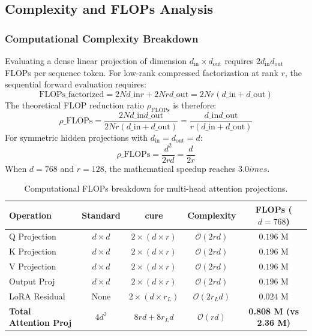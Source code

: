 \subsection{Complexity and FLOPs Analysis}
\subsubsection{Computational Complexity Breakdown}
Evaluating a dense linear projection of dimension $d_{\text{in}} \times d_{\text{out}}$ requires $2 d_{\text{in}} d_{\text{out}}$ FLOPs per sequence token. For low-rank compressed factorization at rank $r$, the sequential forward evaluation requires:
\[
\text{FLOPs}\_{\text{factorized}} = 2 N d\_{\text{in}} r + 2 N r d\_{\text{out}} = 2 N r (d\_{\text{in}} + d\_{\text{out}})
\]
The theoretical FLOP reduction ratio $\rho_{\text{FLOPs}}$ is therefore:
\[
\rho\_{\text{FLOPs}} = \frac{2 N d\_{\text{in}} d\_{\text{out}}}{2 N r (d\_{\text{in}} + d\_{\text{out}})} = \frac{d\_{\text{in}} d\_{\text{out}}}{r (d\_{\text{in}} + d\_{\text{out}})}
\]
For symmetric hidden projections with $d_{\text{in}} = d_{\text{out}} = d$:
\[
\rho\_{\text{FLOPs}} = \frac{d^2}{2 r d} = \frac{d}{2 r}
\]
When $d = 768$ and $r = 128$, the mathematical speedup reaches $3.0	imes$.

\begin{table}[H]
\centering
\small
\begin{tabular}{lcccc}
\toprule
\textbf{Operation} & \textbf{Standard} & \textbf{cure} & \textbf{Complexity} & \textbf{FLOPs ($d=768$)} \\
\midrule
Q Projection & $d \times d$ & $2 \times (d \times r)$ & $\mathcal{O}(2rd)$ & $0.196$ M \\
K Projection & $d \times d$ & $2 \times (d \times r)$ & $\mathcal{O}(2rd)$ & $0.196$ M \\
V Projection & $d \times d$ & $2 \times (d \times r)$ & $\mathcal{O}(2rd)$ & $0.196$ M \\
Output Proj & $d \times d$ & $2 \times (d \times r)$ & $\mathcal{O}(2rd)$ & $0.196$ M \\
LoRA Residual & None & $2 \times (d \times r_L)$ & $\mathcal{O}(2r_L d)$ & $0.024$ M \\
\midrule
\textbf{Total Attention Proj} & $4 d^2$ & $8rd + 8r_L d$ & $\mathcal{O}(rd)$ & \textbf{0.808 M (vs 2.36 M)} \\
\bottomrule
\end{tabular}
\caption{Computational FLOPs breakdown for multi-head attention projections.}
\end{table}

